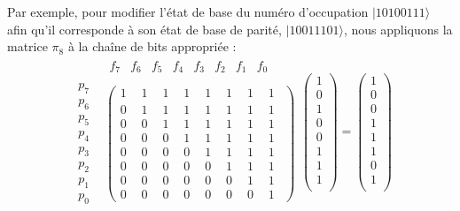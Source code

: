 \documentclass[12pt,a4paper,svgnames,x11names,rgb,table]{article} %
\numberwithin{equation}{section} %
\numberwithin{figure}{section} %
\numberwithin{table}{section} %
\begin{document}
Par exemple, pour modifier l'état de base du numéro d'occupation $|1 0 1 0 0 1 1 1\rangle$ afin qu'il corresponde à son état de base de parité, $|1 0 0 1 1 1 0 1\rangle$, nous appliquons la matrice $\pi_8$ à la chaîne de bits appropriée :
\begin{equation}
    \begin{matrix}
& \begin{matrix}f_7 & f_6 & f_5 & f_4 & f_3 & f_2 & f_1 & f_0 \end{matrix} \\
\begin{matrix}p_7\\p_6\\p_5\\p_4\\p_3\\p_2\\p_1\\p_0\end{matrix}&
\begin{pmatrix} 1_{\phantom{7}} & 1_{\phantom{6}} & 1_{\phantom{5}} & 1_{\phantom{4}} & 1_{\phantom{3}} & 1_{\phantom{2}} & 1_{\phantom{1}} & 1_{\phantom{0}} \\
               0 & 1 & 1 & 1 & 1 & 1 & 1 & 1 \\
               0 & 0 & 1 & 1 & 1 & 1 & 1 & 1 \\
               0 & 0 & 0 & 1 & 1 & 1 & 1 & 1 \\
               0 & 0 & 0 & 0 & 1 & 1 & 1 & 1 \\
               0 & 0 & 0 & 0 & 0 & 1 & 1 & 1 \\
               0 & 0 & 0 & 0 & 0 & 0 & 1 & 1 \\
               0 & 0 & 0 & 0 & 0 & 0 & 0 & 1 
 \end{pmatrix}
\end{matrix}
\begin{pmatrix}
  1 \\
  0 \\
  1 \\
  0 \\
  0 \\
  1 \\
  1 \\
  1\\
 \end{pmatrix}
 =
 \begin{pmatrix}
  1 \\
  0 \\
  0 \\
  1 \\
  1 \\
  1 \\
  0 \\
  1\\
 \end{pmatrix}
\end{equation}
\end{document}
